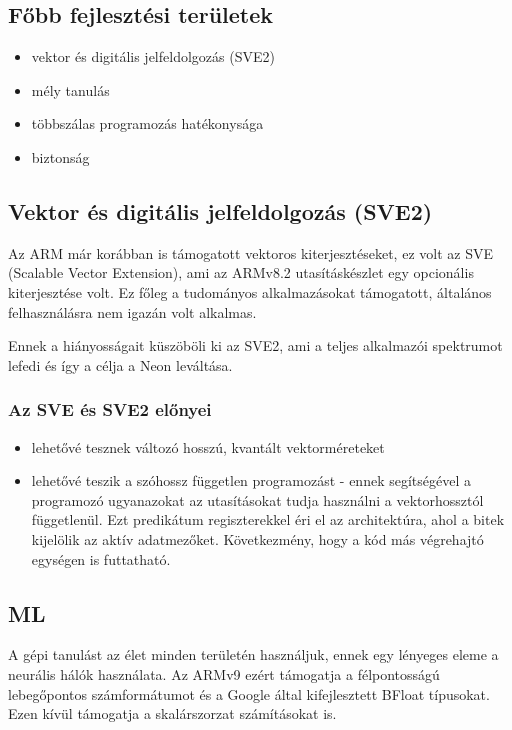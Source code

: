 \subsection{Főbb fejlesztési területek}
\begin{itemize}
    \item vektor és digitális jelfeldolgozás (SVE2)
    \item mély tanulás
    \item többszálas programozás hatékonysága
    \item biztonság
\end{itemize}

\subsection{Vektor és digitális jelfeldolgozás (SVE2)}
Az ARM már korábban is támogatott vektoros kiterjesztéseket, ez volt az SVE (Scalable Vector Extension), ami az ARMv8.2 utasításkészlet egy opcionális kiterjesztése volt.
Ez főleg a tudományos alkalmazásokat támogatott, általános felhasználásra nem igazán volt alkalmas.

Ennek a hiányosságait küszöböli ki az SVE2, ami a teljes alkalmazói spektrumot lefedi és így a célja a Neon leváltása.

\subsubsection{Az SVE és SVE2 előnyei}
\begin{itemize}
    \item lehetővé tesznek változó hosszú, kvantált vektorméreteket
    \item lehetővé teszik a szóhossz független programozást - ennek segítségével a programozó ugyanazokat az utasításokat tudja használni a vektorhossztól függetlenül. Ezt predikátum regiszterekkel éri el az architektúra, ahol a bitek kijelölik az aktív adatmezőket. Következmény, hogy a kód más végrehajtó egységen is futtatható.
\end{itemize}

\subsection{ML}
A gépi tanulást az élet minden területén használjuk, ennek egy lényeges eleme a neurális hálók használata.
Az ARMv9 ezért támogatja a félpontosságú lebegőpontos számformátumot és a Google által kifejlesztett BFloat típusokat.
Ezen kívül támogatja a skalárszorzat számításokat is.

